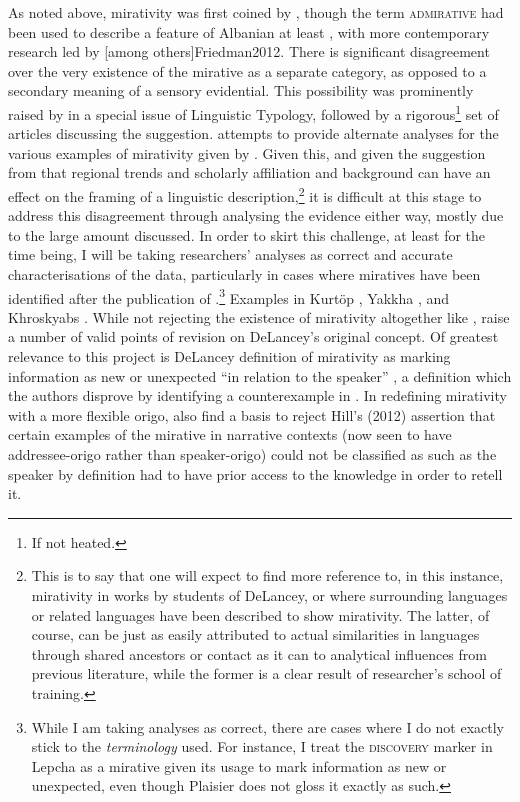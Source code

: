 As noted above, mirativity was first coined by , though the term \textsc{admirative} had been used to describe a feature of Albanian at least , with more contemporary research led by [among others]{Friedman2012}. There is significant disagreement over the very existence of the mirative as a separate category, as opposed to a secondary meaning of a sensory evidential. This possibility was prominently raised by  in a special issue of Linguistic Typology, followed by a rigorous\footnote{If not heated.} set of articles discussing the suggestion.  attempts to provide alternate analyses for the various examples of mirativity given by . Given this, and given the suggestion from  that regional trends and scholarly affiliation and background can have an effect on the framing of a linguistic description,\footnote{This is to say that one will expect to find more reference to, in this instance, mirativity in works by students of DeLancey, or where surrounding languages or related languages have been described to show mirativity. The latter, of course, can be just as easily attributed to actual similarities in languages through shared ancestors or contact as it can to analytical influences from previous literature, while the former is a clear result of researcher's school of training.} it is difficult at this stage to address this disagreement through analysing the evidence either way, mostly due to the large amount discussed. In order to skirt this challenge, at least for the time being, I will be taking researchers' analyses as correct and accurate characterisations of the data, particularly in cases where miratives have been identified after the publication of .\footnote{While I am taking analyses as correct, there are cases where I do not exactly stick to the \textit{terminology} used. For instance, I treat the \textsc{discovery} marker in Lepcha \cite[Internal Isolate: India,][]{Plaisier2007} as a mirative given its usage to mark information as new or unexpected, even though Plaisier does not gloss it exactly as such.} Examples in Kurtöp \cite[East Bodish, Bhutan][]{Hyslop2017}, Yakkha \cite[Kiranti, Nepal][]{Schackow2015}, and Khroskyabs \cites[Rgyalrongic, PRC][]{Lai2017}{TaylorAdams2020}. While not rejecting the existence of mirativity altogether like ,  raise a number of valid points of revision on DeLancey's original concept. Of greatest relevance to this project is DeLancey definition of mirativity as marking information as new or unexpected ``in relation to the speaker'' \cite[488]{HengeveldOlbertz2012}, a definition which the authors disprove by identifying a counterexample in . In redefining mirativity with a more flexible origo,  also find a basis to reject Hill's (2012) assertion that certain examples of the mirative in narrative contexts (now seen to have addressee-origo rather than speaker-origo) could not be classified as such as the speaker by definition had to have prior access to the knowledge in order to retell it.


